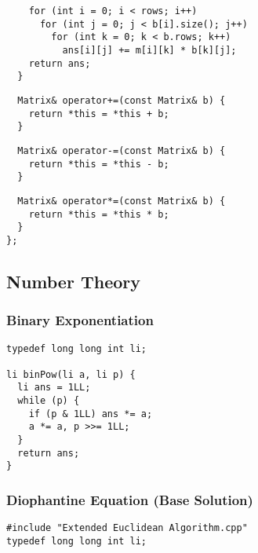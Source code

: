 \documentclass[twoside]{article}
\begin{document}
\begin{multicols*}{2}
\begin{verbatim}
    for (int i = 0; i < rows; i++)
      for (int j = 0; j < b[i].size(); j++)
        for (int k = 0; k < b.rows; k++)
          ans[i][j] += m[i][k] * b[k][j];
    return ans;
  }
\end{verbatim}
\vspace{-12pt}
\begin{verbatim}
  Matrix& operator+=(const Matrix& b) {
    return *this = *this + b;
  }
\end{verbatim}
\vspace{-12pt}
\begin{verbatim}
  Matrix& operator-=(const Matrix& b) {
    return *this = *this - b;
  }
\end{verbatim}
\vspace{-12pt}
\begin{verbatim}
  Matrix& operator*=(const Matrix& b) {
    return *this = *this * b;
  }
};
\end{verbatim}

\subsectionfont{\bfseries\sffamily\centering\LARGE}
\vspace{0em}
\subsection*{Number Theory}
\vspace{2em}
\subsubsectionfont{\large\bfseries\sffamily\underline}
\subsubsection*{Binary Exponentiation}
\begin{verbatim}
typedef long long int li;

li binPow(li a, li p) {
  li ans = 1LL;
  while (p) {
    if (p & 1LL) ans *= a;
    a *= a, p >>= 1LL;
  }
  return ans;
}
\end{verbatim}

\subsubsectionfont{\large\bfseries\sffamily\underline}
\subsubsection*{Diophantine Equation (Base Solution)}
\begin{verbatim}
#include "Extended Euclidean Algorithm.cpp"
typedef long long int li;


\end{verbatim}
\end{multicols*}
\end{document}
